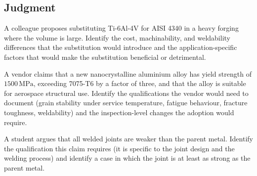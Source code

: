 \subsection*{Judgment}

\begin{exercise}
A colleague proposes substituting Ti-6Al-4V for AISI 4340 in a heavy
forging where the volume is large. Identify the cost, machinability,
and weldability differences that the substitution would introduce
and the application-specific factors that would make the substitution
beneficial or detrimental.
\end{exercise}

\begin{exercise}
A vendor claims that a new nanocrystalline aluminium alloy has yield
strength of $1500\,\text{MPa}$, exceeding 7075-T6 by a factor of
three, and that the alloy is suitable for aerospace structural use.
Identify the qualifications the vendor would need to document
(grain stability under service temperature, fatigue behaviour,
fracture toughness, weldability) and the inspection-level changes the
adoption would require.
\end{exercise}

\begin{exercise}
A student argues that all welded joints are weaker than the parent
metal. Identify the qualification this claim requires (it is
specific to the joint design and the welding process) and identify
a case in which the joint is at least as strong as the parent metal.
\end{exercise}
